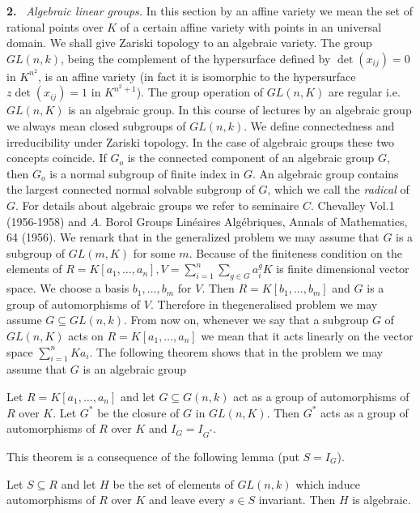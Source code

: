 {\bf 2.}~ {\textit{Algebraic linear groups.}}
 In this  section  by an affine
  variety we mean the set of rational  points over $K$ of a certain
  affine variety with points in an universal domain. We shall give
  Zariski topology to an algebraic variety. The  group $GL(n,k)$,
  being  the complement of the hypersurface  defined by
  $\det(x_{ij})=0$ in $K^{n^2}$, is an affine variety (in fact it is
  isomorphic to the hypersurface $z \det(x_{ij})=1$ in
  $K^{n^2+1}$). The group  operation  of $GL(n,K)$ are  regular
  i.e. $GL(n,K)$ is an algebraic group. In this  course  of lectures
  by an algebraic  group we always mean  closed  subgroups of
  $GL(n,k)$. We define connectedness and irreducibility under Zariski
  topology. In the case of algebraic groups  these two concepts
  coincide. If $G_o$ is the  connected  component of an  algebraic
  group $G$, then $G_o$ is a normal subgroup of finite index in $G$. An
  algebraic group contains the largest connected  normal  solvable
  subgroup of $G$, which we call the  \textit{radical} of $G$. For
  details  about algebraic  groups  we refer to seminaire
  $C$. Chevalley Vol.1 (1956-1958) and $A$. Borol Groups Lin\'eaires
  Alg\'ebriques, Annals of Mathematics, 64 (1956). 
We remark that in the generalized problem we may assume that  $G$ is
a subgroup of $GL(m,K)$ for some $m$. Because of the finiteness
condition on the elements of $R=K[a_1 , \ldots , a_n],
V=\sum\limits^{n}_{i=1}\sum\limits_{g \in G} a_i^gK$ is
finite dimensional vector space. We  choose  a basis  $b_1, \ldots ,
b_m$ for  $V$. Then  $R=K[b_1, \ldots , b_m]$ and  $G$ is a group of
automorphisms  of  $V$. Therefore in the\pageoriginale generalised
problem  we may 
assume $G\subseteq GL(n,k)$. From  now  on, whenever we say
that  a subgroup  $G$ of  $GL(n,K)$ acts on $R=K [a_1, \ldots, a_n]$
we mean that  it acts linearly on the vector space
$\sum\limits^{n}_{i=1} Ka_i$. The following theorem shows that in the
problem we may assume that  $G$ is an algebraic group 

\begin{thm}%
Let  $R=K[a_1, \ldots , a_n]$ and let $G \subseteq  G(n,k)$ act as a group
of automorphisms of $R$ over $K$. Let  $G^*$ be the closure  of $G$ in
$GL(n,K)$. Then  $G^*$ acts  as a group  of automorphisms of $R$ over
$K$ and  $I_G=I_{G^*}$. 
\end{thm}

This theorem is a consequence of the following  lemma (put $S=I_G$). 

\begin{lemma*}
Let  $S \subseteq R$ and let  $H$ be  the set of elements  of
$GL(n,k)$ which  induce  automorphisms of $R$ over $K$ and leave
every  $s \in S$ invariant. Then $H$ is  algebraic. 
\end{lemma*}

